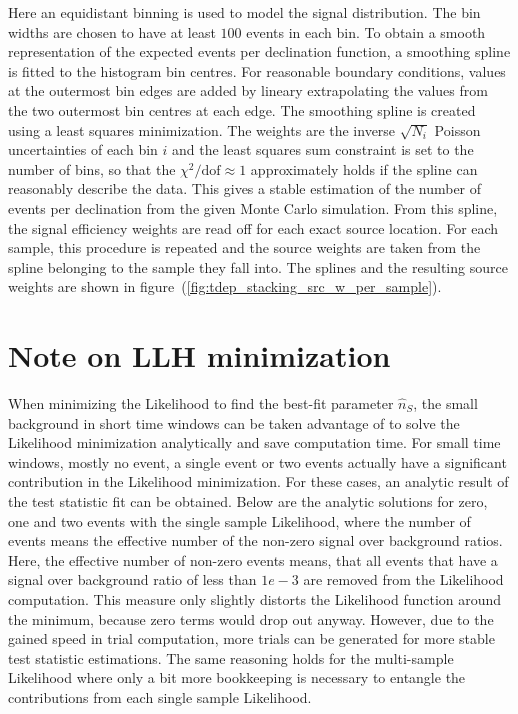Here an equidistant binning is used to model the signal distribution.
The bin widths are chosen to have at least $100$ events in each bin.
To obtain a smooth representation of the expected events per declination function, a smoothing spline is fitted to the histogram bin centres.
For reasonable boundary conditions, values at the outermost bin edges are added by lineary extrapolating the values from the two outermost bin centres at each edge.
The smoothing spline is created using a least squares minimization.
The weights are the inverse $\sqrt{N_i}$ Poisson uncertainties of each bin $i$ and the least squares sum constraint is set to the number of bins, so that the $\chi^2 / \text{dof} \approx 1$ approximately holds if the spline can reasonably describe the data.
This gives a stable estimation of the number of events per declination from the given Monte Carlo simulation.
From this spline, the signal efficiency weights are read off for each exact source location.
For each sample, this procedure is repeated and the source weights are taken from the spline belonging to the sample they fall into.
The splines and the resulting source weights are shown in figure~(\ref{fig:tdep_stacking_src_w_per_sample}).


\section{Note on LLH minimization}
When minimizing the Likelihood to find the best-fit parameter $\hat{n}_S$, the small background in short time windows can be taken advantage of to solve the Likelihood minimization analytically and save computation time.
For small time windows, mostly no event, a single event or two events actually have a significant contribution in the Likelihood minimization.
For these cases, an analytic result of the test statistic fit can be obtained.
Below are the analytic solutions for zero, one and two events with the single sample Likelihood, where the number of events means the effective number of the non-zero signal over background ratios.
Here, the effective number of non-zero events means, that all events that have a signal over background ratio of less than $\si{1e-3}$ are removed from the Likelihood computation.
This measure only slightly distorts the Likelihood function around the minimum, because zero terms would drop out anyway.
However, due to the gained speed in trial computation, more trials can be generated for more stable test statistic estimations.
The same reasoning holds for the multi-sample Likelihood where only a bit more bookkeeping is necessary to entangle the contributions from each single sample Likelihood.

